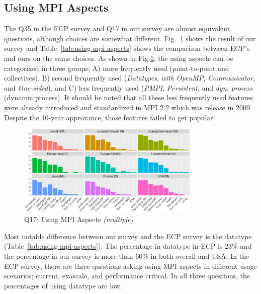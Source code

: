 \documentclass[preprint,5p,times]{elsarticle}
\def\myquote#1{{\it #1}}
\begin{document}
\subsection{Using MPI Aspects}\label{sec:mpi-aspects}

The Q35 in the ECP survey and Q17 in our survey are almost equivalent
questions, although choices are somewhat
different. Fig.~\ref{fig:using-mpi-aspects} shows the result of our
survey and Table~\ref{tab:using-mpi-aspects} shows the comparison
between ECP's and ours on the same choices. As shown in
Fig.\ref{fig:using-mpi-aspects}, the
using aspects can be categorixed in three groups; A) more frequently
used (point-to-point and collectives), B) second frequently used
(\myquote{Datatypes}, \myquote{with OpenMP}, \myquote{Communicator}, and \myquote{One-sided}), and C) less
frequently used (\myquote{PMPI}, \myquote{Persistent}, and
\myquote{dyn. process} (dynamic process).
It should be noted that all these less frequently used features were
already introduced and standardized in MPI 2.2 which was release in
2009. Despite the 10-year appearance, those features failed to get
popular.

\begin{figure}[htb]
  \begin{center}
    \includegraphics[width=8.7cm]{R-scripts/Q17.pdf}
    \caption{Q17: Using MPI Aspects {\it(multiple)}}
    \label{fig:using-mpi-aspects}
  \end{center}
\end{figure}

Most notable difference between our survey and the ECP survey is the
datatype (Table~\ref{tab:using-mpi-aspects}). The percentage in
datatype in ECP is 23\% and the percentage in our survey is more
than 60\% in both overall and USA. In the ECP survey, there are three
questions asking using MPI aspects in different usage scenarios; current,
exascale, and performance critical. In all three questions, the
percentages of using datatype are low.
\end{document}
